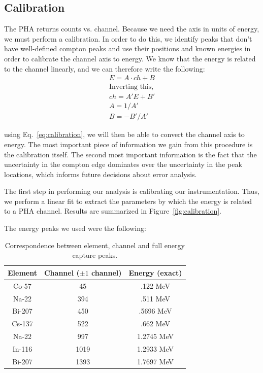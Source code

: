 \documentclass[reprint, nobibnotes, amssymb, amsmath, amsfonts, physics, mathtools, mathrsfs, floatfix]{revtex4-1}
\begin{document}
    \subsection{Calibration}
      The PHA returns counts vs. channel.  Because we need the axis in units of energy, we must perform a calibration.  In order to do this, we identify peaks that don't have well-defined compton peaks and use their positions and known energies in order to calibrate the channel axis to energy.  We know that the energy is related to the channel linearly, and we can therefore write the following:
      \begin{gather}
        E = A \cdot ch + B \label{eq:calibration}\\
        \text{Inverting this,}\nonumber \\
        ch = A'E + B' \\
        A = 1/A' \\
        B = -B'/A'
      \end{gather}

      using Eq.~\ref{eq:calibration}, we will then be able to convert the channel axis to energy.  The most important piece of information we gain from this procedure is the calibration itself.  The second most important information is the fact that the uncertainty in the compton edge dominates over the uncertainty in the peak locations, which informs future decisions about error analysis.

      \hspace{.25cm}

      The first step in performing our analysis is calibrating our instrumentation.  Thus, we perform a linear fit to extract the parameters by which the energy is related to a PHA channel.  Results are summarized in Figure~\ref{fig:calibration}.

      The energy peaks we used were the following:

      \begin{table}[h]
        \centering
        \begin{tabular}{|c|c|c|}
          \hline
          Element & Channel ($\pm1$ channel) & Energy (exact) \\ \hline
          Co-57 & 45 & .122 MeV \\ \hline
          Na-22 & 394 & .511 MeV \\ \hline
          Bi-207 & 450 & .5696 MeV \\ \hline
          Cs-137 & 522 & .662 MeV \\ \hline
          Na-22 & 997 & 1.2745 MeV \\ \hline
          In-116 & 1019 & 1.2933 MeV \\ \hline
          Bi-207 & 1393 & 1.7697 MeV \\ \hline
        \end{tabular}
        \caption{Correspondence between element, channel and full energy capture peaks. \label{tab:calibration_points}}
      \end{table}
\end{document}
